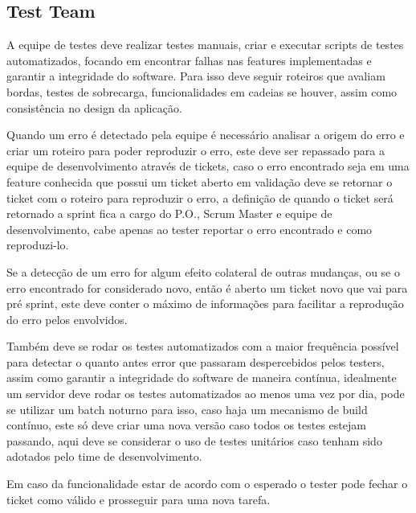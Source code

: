 \documentclass[
    article,            %
    11pt,               %
    oneside,            %
    a4paper,            %
    english,            %
    brazil,             %
    sumario=tradicional
    ]{abntex2}
\begin{document}
 
\subsection{Test Team}

A equipe de testes deve realizar testes manuais, criar e executar scripts de testes automatizados, focando em encontrar falhas nas features implementadas e garantir a integridade do software. Para isso deve seguir roteiros que avaliam bordas, testes de sobrecarga, funcionalidades em cadeias se houver, assim como consistência no design da aplicação.

Quando um erro é detectado pela equipe é necessário analisar  a origem do erro e criar um roteiro para poder reproduzir o erro, este deve ser repassado para a equipe de desenvolvimento através de tickets, caso o erro encontrado seja em uma feature conhecida que possui um ticket aberto em validação deve se retornar o ticket com o roteiro para reproduzir o erro, a definição de quando o ticket será retornado a sprint fica a cargo do P.O., Scrum Master e equipe de desenvolvimento, cabe apenas ao tester reportar o erro encontrado e como reproduzi-lo.

Se a detecção de um erro for algum efeito colateral de outras mudanças, ou se o erro encontrado for considerado novo, então é aberto um ticket novo que vai para pré sprint, este deve conter o máximo de informações para facilitar a reprodução do erro pelos envolvidos.

Também deve se rodar os testes automatizados com a maior frequência possível para detectar o quanto antes error que passaram despercebidos pelos testers, assim como garantir a integridade do software de maneira contínua, idealmente um servidor deve rodar os testes automatizados ao menos uma vez por dia, pode se utilizar um batch noturno para isso, caso haja um mecanismo de build contínuo, este só deve criar uma nova versão caso todos os testes estejam passando, aqui deve se considerar o uso de testes unitários caso tenham sido adotados pelo time de desenvolvimento.

Em caso da funcionalidade estar de acordo com o esperado o tester pode fechar o ticket como válido e prosseguir para uma nova tarefa.



% 

\end{document}
